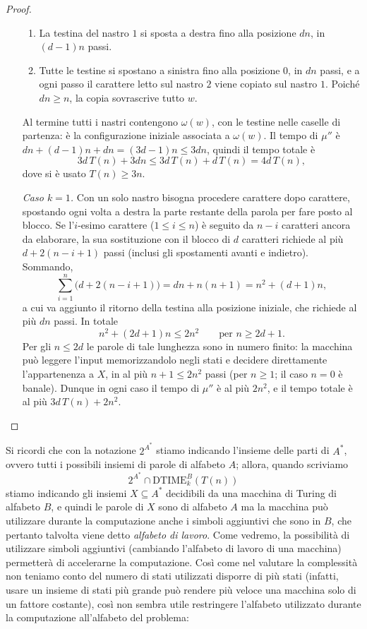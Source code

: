 \begin{lemm}
\begin{proof}
\begin{itemize}
\begin{enumerate}
  \item La testina del nastro $1$ si sposta a destra fino alla posizione $dn$, in
  $(d-1)n$ passi.
  \item Tutte le testine si spostano a sinistra fino alla posizione $0$, in $dn$ passi,
  e a ogni passo il carattere letto sul nastro $2$ viene copiato sul nastro $1$.
  Poiché $dn \geq n$, la copia sovrascrive tutto $w$.
\end{enumerate}
Al termine tutti i nastri contengono $\omega(w)$, con le testine nelle caselle di
partenza: è la configurazione iniziale associata a $\omega(w)$. Il tempo di $\mu''$ è
$dn + (d-1)n + dn = (3d-1)n \leq 3dn$, quindi il tempo totale è
\[
3d\,T(n) + 3dn \leq 3d\,T(n) + d\,T(n) = 4d\,T(n),
\]
dove si è usato $T(n) \geq 3n$.
\item[\emph{Caso $k = 1$.}]
 Con un solo nastro bisogna procedere carattere dopo carattere,
spostando ogni volta a destra la parte restante della parola per fare posto al blocco.
Se l'$i$-esimo carattere ($1 \le i \le n$) è seguito da $n-i$ caratteri ancora da
elaborare, la sua sostituzione con il blocco di $d$ caratteri richiede al più
$d + 2(n-i+1)$ passi (inclusi gli spostamenti avanti e indietro). Sommando,
\[
\sum_{i=1}^{n} \big(d + 2(n-i+1)\big) = dn + n(n+1) = n^2 + (d+1)n,
\]
a cui va aggiunto il ritorno della testina alla posizione iniziale, che richiede
al più $dn$ passi. In totale
\[
n^2 + (2d+1)n \leq 2n^2 \qquad \text{per } n \geq 2d+1.
\]
Per gli $n \leq 2d$ le parole di tale lunghezza sono in numero finito: la macchina può
leggere l'input memorizzandolo negli stati e decidere direttamente l'appartenenza
a $X$, in al più $n+1 \leq 2n^2$ passi (per $n \geq 1$; il caso $n = 0$ è banale).
Dunque in ogni caso il tempo di $\mu''$ è al più $2n^2$, e il tempo totale è
al più $3d\,T(n) + 2n^2$.
\end{itemize}
\end{proof}
\end{lemm}
Si ricordi che con la notazione $2^{A^*}$ stiamo indicando l'insieme delle parti di $A^*$,
ovvero tutti i possibili insiemi di parole di alfabeto $A$; allora, quando scriviamo
\[
  2^{A^*} \cap \mathrm{DTIME}^B_k(T(n))
\]
stiamo indicando gli insiemi $X \subseteq A^*$ decidibili da una macchina di Turing di
alfabeto $B$, e quindi le parole di $X$ sono di alfabeto $A$ ma la macchina può utilizzare
durante la computazione anche i simboli aggiuntivi che sono in $B$, che pertanto talvolta
viene detto \emph{alfabeto di lavoro}.
Come vedremo, la possibilità di utilizzare simboli aggiuntivi (cambiando l'alfabeto di
lavoro di una macchina) permetterà di accelerarne la computazione. Così come nel valutare
la complessità non teniamo conto del numero di stati utilizzati
disporre di più stati
(infatti, usare un insieme di stati più grande può rendere più veloce una macchina solo di un fattore costante), così non sembra utile
restringere l'alfabeto utilizzato durante la computazione all'alfabeto del problema:

